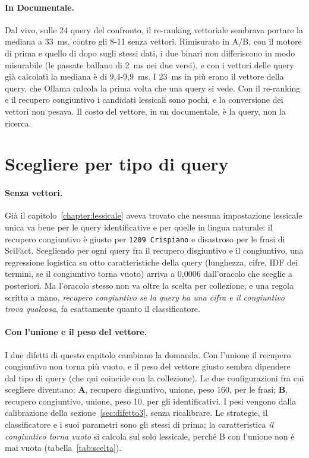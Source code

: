 \paragraph{In Documentale.} Dal vivo, sulle 24 query del confronto, il re-ranking
vettoriale sembrava portare la mediana a 33~ms, contro gli 8-11 senza vettori. Rimisurato in A/B, con il
motore di prima e quello di dopo sugli stessi dati, i due binari non differiscono
in modo misurabile (le passate ballano di 2~ms nei due versi), e con i vettori
delle query già calcolati la mediana è di 9,4-9,9~ms. I 23~ms in più erano il vettore della query, che Ollama
calcola la prima volta che una query si vede. Con il re-ranking e il recupero
congiuntivo i candidati lessicali sono pochi, e la conversione dei vettori non
pesava. Il costo del vettore, in un documentale, è la query, non la ricerca.

\section{Scegliere per tipo di query}\label{sec:scelta}

\paragraph{Senza vettori.} Già il capitolo~\ref{chapter:lessicale} aveva trovato che
nessuna impostazione lessicale unica va bene per le query identificative e per
quelle in lingua naturale: il recupero congiuntivo è giusto per
\texttt{1209 Crispiano} e disastroso per le frasi di SciFact. Scegliendo per ogni
query fra il recupero disgiuntivo e il congiuntivo, una regressione logistica su
otto caratteristiche della query (lunghezza, cifre, IDF dei termini, se il
congiuntivo torna vuoto) arriva a 0,0006 dall'oracolo che sceglie a posteriori.
Ma l'oracolo stesso non va oltre la scelta per collezione, e una regola scritta a
mano, \emph{recupero congiuntivo se la query ha una cifra e il congiuntivo trova
qualcosa}, fa esattamente quanto il classificatore.

\paragraph{Con l'unione e il peso del vettore.} I due difetti di questo capitolo
cambiano la domanda. Con l'unione il recupero congiuntivo non torna più vuoto, e il
peso del vettore giusto sembra dipendere dal tipo di query (che qui coincide con la collezione). Le due configurazioni fra cui
scegliere diventano: \textbf{A}, recupero disgiuntivo, unione, peso 160, per le
frasi; \textbf{B}, recupero congiuntivo, unione, peso 10, per gli identificativi.
I pesi vengono dalla calibrazione della sezione~\ref{sec:difetto3}, senza
ricalibrare. Le strategie, il classificatore e i suoi parametri sono gli stessi di
prima; la caratteristica \emph{il congiuntivo torna vuoto} si calcola sul solo lessicale,
perché B con l'unione non è mai vuota (tabella~\ref{tab:scelta}).

